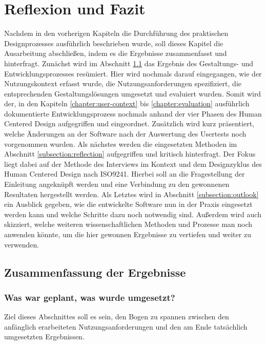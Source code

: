 \chapter{Reflexion und Fazit}
\label{chapter:conclusion}

Nachdem in den vorherigen Kapiteln die Durchführung des praktischen
Designprozesses ausführlich beschrieben wurde, soll dieses Kapitel die
Ausarbeitung abschließen, indem es die Ergebnisse zusammenfasst und
hinterfragt. Zunächst wird im Abschnitt \ref{subsection:resultDescription} das
Ergebnis des Gestaltungs- und Entwicklungsprozesses resümiert. Hier wird
nochmals darauf eingegangen, wie der Nutzungskontext erfasst wurde, die
Nutzungsanforderungen spezifiziert, die entsprechenden Gestaltungslösungen
umgesetzt und evaluiert wurden. Somit wird der, in den Kapiteln
\ref{chapter:user-context} bis \ref{chapter:evaluation} ausführlich
dokumentierte Entwicklungsprozess nochmals anhand der vier Phasen des Human
Centered Design aufgegriffen und eingeordnet\cite{ISO9241}. Zusätzlich wird
kurz präsentiert, welche Änderungen an der Software nach der Auswertung des
Usertests noch vorgenommen wurden. Als nächstes werden die eingesetzten
Methoden im Abschnitt \ref{subsection:reflection} aufgegriffen und kritisch
hinterfragt. Der Fokus liegt dabei auf der Methode des Interviews im Kontext
und dem Designzyklus des Human Centered Design nach ISO9241. Hierbei soll an
die Fragestellung der Einleitung angeknüpft werden und eine Verbindung zu den
gewonnenen Resultaten hergestellt werden. Als Letztes wird in Abschnitt
\ref{subsection:outlook} ein Ausblick gegeben, wie die entwickelte Software nun
in der Praxis eingesetzt werden kann und welche Schritte dazu noch notwendig
sind. Außerdem wird auch skizziert, welche weiteren wissenschaftlichen Methoden
und Prozesse man noch anwenden könnte, um die hier gewonnen Ergebnisse zu
vertiefen und weiter zu verwenden.

\section{Zusammenfassung der Ergebnisse}
\label{subsection:resultDescription}

\subsection*{Was war geplant, was wurde umgesetzt?}
Ziel dieses Abschnittes soll es sein, den Bogen zu spannen zwischen den
anfänglich erarbeiteten Nutzungsanforderungen und den am Ende tatsächlich
umgesetzten Ergebnissen.

